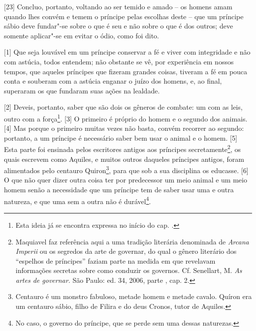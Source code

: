 {[}23{]} Concluo, portanto, voltando ao ser temido e amado -- os homens
amam quando lhes convém e temem o príncipe pelas escolhas deste -- que
um príncipe sábio deve fundar"-se sobre o que é seu e não sobre o que é
dos outros; deve somente aplicar"-se em evitar o ódio, como foi dito.


{[}1{]} Que seja louvável em um príncipe conservar a fé e viver com
integridade e não com astúcia, todos entendem; não obstante se vê, por
experiência em nossos tempos, que aqueles príncipes que fizeram grandes
coisas, tiveram a fé em pouca conta e souberam com a astúcia enganar o
juízo dos homens, e, ao final, superaram os que fundaram suas ações na
lealdade.

{[}2{]} Deveis, portanto, saber que são dois os gêneros de combate: um
com as leis, outro com a força\footnote{Esta ideia já se encontra
  expressa no início do cap. .}. {[}3{]} O primeiro é próprio do homem
e o segundo dos animais. {[}4{]} Mas porque o primeiro muitas vezes não
basta, convém recorrer ao segundo: portanto, a um príncipe é necessário
saber bem usar o animal e o homem. {[}5{]} Esta parte foi ensinada pelos
escritores antigos aos príncipes secretamente\footnote{Maquiavel faz
  referência aqui a uma tradição literária denominada de \emph{Arcana
  Imperii} ou os segredos da arte de governar, do qual o gênero
  literário dos ``espelhos de príncipes'' faziam parte na medida em que
  revelavam informações secretas sobre como conduzir os governos. Cf.
  Senellart, M. \emph{As artes de governar.} São Paulo: ed. 34, 2006,
  parte , cap. 2.}, os quais escrevem como Aquiles, e muitos outros
daqueles príncipes antigos, foram alimentados pelo centauro
Quiron\footnote{Centauro é um monstro fabuloso, metade homem e metade
  cavalo. Quíron era um centauro sábio, filho de Filira e do deus
  Cronos, tutor de Aquiles.}, para que sob a sua disciplina os educasse.
{[}6{]} O que não quer dizer outra coisa ter por predecessor um meio
animal e um meio homem senão a necessidade que um príncipe tem de saber
usar uma e outra natureza, e que uma sem a outra não é durável\footnote{No
  caso, o governo do príncipe, que se perde sem uma dessas naturezas.}.

